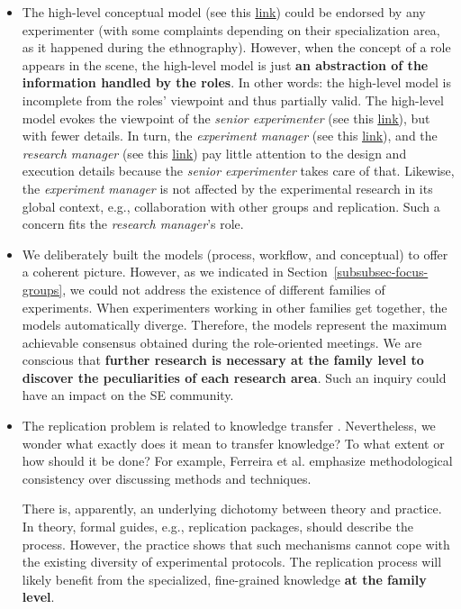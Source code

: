 \begin{itemize}
	\item The high-level conceptual model (see this \href{https://zenodo.org/record/7102405#.YyxvFOzMLUK}{\ul{link}}) could be endorsed by any experimenter (with some complaints depending on their specialization area, as it happened during the ethnography). However, when the concept of a role appears in the scene, the high-level model is just \textbf{an abstraction of the information handled by the roles}. In other words: the high-level model is incomplete from the roles' viewpoint and thus partially valid. The high-level model evokes the viewpoint of the \textit{senior experimenter} (see this \href{https://zenodo.org/record/7102464#.YyxvsezMLUK}{\ul{link}}), but with fewer details. In turn, the \textit{experiment manager} (see this \href{https://zenodo.org/record/7102450#.Yyxv6ezMLUL}{\ul{link}}), and the \textit{research manager} (see this \href{https://zenodo.org/record/7102431#.YyxwGezMLUL}{\ul{link}}) pay little attention to the design and execution details because the \textit{senior experimenter} takes care of that. Likewise, the \textit{experiment manager} is not affected by the experimental research in its global context, e.g., collaboration with other groups and replication. Such a concern fits the \textit{research manager}'s role. 
\item We deliberately built the models (process, workflow, and conceptual) to offer a coherent picture. However, as we indicated in Section~\ref{subsubsec-focus-groups}, we could not address the existence of different families of experiments. When experimenters working in other families get together, the models automatically diverge. Therefore, the models represent the maximum achievable consensus obtained during the role-oriented meetings. We are conscious that \textbf{further research is necessary at the family level to discover the peculiarities of each research area}. Such an inquiry could have an impact on the SE community. 
\item The replication problem is related to knowledge transfer \cite{Shull-2004-Knowledge-sharing-issues-SE}. Nevertheless, we wonder what exactly does it mean to transfer knowledge? To what extent or how should it be done? For example, Ferreira et al. \cite{Ferreira-2017-planning-experiments} emphasize methodological consistency over discussing methods and techniques. 

There is, apparently, an underlying dichotomy between theory and practice. In theory, formal guides, e.g., replication packages, should describe the process. However, the practice shows that such mechanisms cannot cope with the existing diversity of experimental protocols. The replication process will likely benefit from the specialized, fine-grained knowledge \textbf{at the family level}.
\end{itemize}

